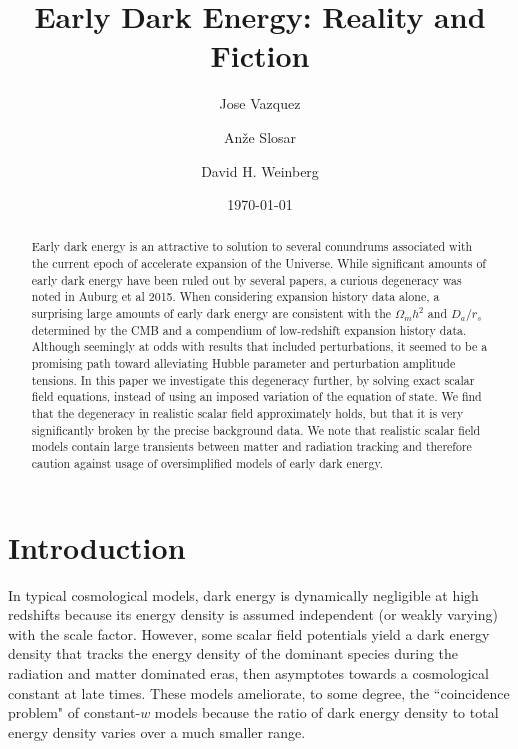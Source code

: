 \documentclass[preprintnumbers,amsmath,amssymb,prd,superscriptaddress,notitlepag
e, twocolumn]{revtex4-1}
\begin{document}
\title{Early Dark Energy: Reality and Fiction}

\author{Jose Vazquez}
\author{An\v{z}e Slosar}
\author{David H. Weinberg}
\date{\today}

\begin{abstract}
  Early dark energy is an attractive to solution to several conundrums
  associated with the current epoch of accelerate expansion of the
  Universe. While significant amounts of early dark energy have been
  ruled out by several papers, a curious degeneracy was noted in
  Auburg et al 2015.  When considering expansion history data alone, a
  surprising large amounts of early dark energy are consistent with
  the $\Omega_m h^2$ and $D_a/r_s$ determined by the CMB and a
  compendium of low-redshift expansion history data. Although
  seemingly at odds with results that included perturbations, it
  seemed to be a promising path toward alleviating Hubble parameter
  and perturbation amplitude tensions.  In this paper we investigate
  this degeneracy further, by solving exact scalar field equations,
  instead of using an imposed variation of the equation of state. We
  find that the degeneracy in realistic scalar field approximately
  holds, but that it is very significantly broken by the precise
  background data. We note that realistic scalar field models contain
  large transients between matter and radiation tracking and therefore
  caution against usage of oversimplified models of early dark energy.
  
\end{abstract}

\maketitle

\section{Introduction} 
 In typical cosmological models, dark energy is dynamically negligible
 at high redshifts because its energy density is assumed independent
 (or weakly varying) with the scale factor. However, some scalar field
 potentials yield a dark energy density that tracks the energy density
 of the dominant species during the radiation and matter dominated
 eras, then asymptotes towards a cosmological constant at late times.
 These models ameliorate, to some degree, the ``coincidence problem"
 of constant-$w$ models because the ratio of dark energy density to
 total energy density varies over a much smaller range.
 
\end{document}
